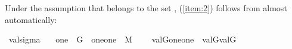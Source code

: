 Under the assumption that  belongs to the set ,
(\ref{item:2}) follows from  almost automatically:

\begin{isabelle}
\isamarkupfalse%
\ valsigma\ {\isacharcolon}\isanewline
\ \ {\isachardoublequoteopen}one\ {\isasymin}\ G\ {\isasymLongrightarrow}\ {\isacharbraceleft}{\isasymlangle}{\isasymtau}{\isacharcomma}one{\isasymrangle}{\isacharcomma}{\isasymlangle}{\isasymrho}{\isacharcomma}one{\isasymrangle}{\isacharbraceright}\ {\isasymin}\ M\ {\isasymLongrightarrow}\isanewline
\ \ \ val{\isacharparenleft}G{\isacharcomma}{\isacharbraceleft}{\isasymlangle}{\isasymtau}{\isacharcomma}one{\isasymrangle}{\isacharcomma}{\isasymlangle}{\isasymrho}{\isacharcomma}one{\isasymrangle}{\isacharbraceright}{\isacharparenright}\ {\isacharequal}\ {\isacharbraceleft}val{\isacharparenleft}G{\isacharcomma}{\isasymtau}{\isacharparenright}{\isacharcomma}val{\isacharparenleft}G{\isacharcomma}{\isasymrho}{\isacharparenright}{\isacharbraceright}{\isachardoublequoteclose}
\end{isabelle}


